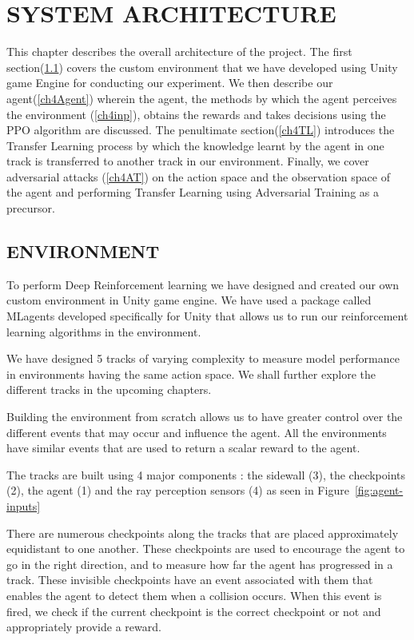
\chapter{SYSTEM ARCHITECTURE} \label{ch4}
%
This chapter describes the overall architecture of the project. The
first section(\ref{ch4Env}) covers the custom environment that we have
developed using Unity game Engine for conducting our experiment. We
then describe our agent(\ref{ch4Agent}) wherein the agent, the methods
by which the agent perceives the environment (\ref{ch4inp}), obtains
the rewards and takes decisions using the PPO algorithm are
discussed. The penultimate section(\ref{ch4TL}) introduces the
Transfer Learning process by which the knowledge learnt by the agent
in one track is transferred to another track in our
environment. Finally, we cover adversarial attacks (\ref{ch4AT}) on
the action space and the observation space of the agent and performing
Transfer Learning using Adversarial Training as a precursor.

\section{ENVIRONMENT} \label{ch4Env}

To perform Deep Reinforcement learning we have designed and created
our own custom environment in Unity game engine. We have used a
package called MLagents developed specifically for Unity that allows
us to run our reinforcement learning algorithms in the environment.

We have designed 5 tracks of varying complexity to measure model
performance in environments having the same action space. We shall
further explore the different tracks in the upcoming chapters.

Building the environment from scratch allows us to have greater
control over the different events that may occur and influence the
agent. All the environments have similar events that are used to
return a scalar reward to the agent.

The tracks are built using 4 major components : the sidewall (3), the
checkpoints (2), the agent (1) and the ray perception sensors (4) as
seen in Figure~\ref{fig:agent-inputs}

There are numerous checkpoints along the tracks that are placed
approximately equidistant to one another. These checkpoints are used
to encourage the agent to go in the right direction, and to measure
how far the agent has progressed in a track. These invisible
checkpoints have an event associated with them that enables the agent
to detect them when a collision occurs. When this event is fired, we
check if the current checkpoint is the correct checkpoint or not and
appropriately provide a reward.

